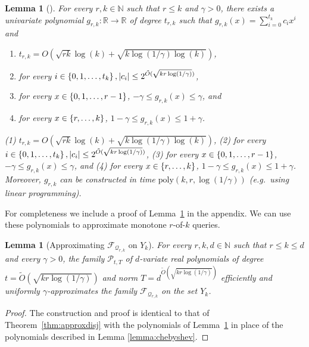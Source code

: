 \documentclass[11pt]{article}
\newcommand\N{\mathbb{N}}
\newcommand\R{\mathbb{R}}
\newcommand\cF{\mathcal{F}}
\newcommand\cP{\mathcal{P}}
\newcommand\cQ{\mathcal{Q}}
\newcommand\poly{\mathrm{poly}}
\newcommand\from{\colon}
\newtheorem{lemma}[theorem]{Lemma}
\theoremstyle{definition}
\begin{document}
\begin{lemma}[\cite{Sherstov09}] \label{lemma:paturi}
For every $r,k \in \N$ such that $r \leq k$ and $\gamma > 0$, there exists a univariate polynomial $g_{r,k}\from \R \to \R$ of degree $t_{r,k}$ such that $g_{r,k}(x) = \sum_{i=0}^{t_k} c_i x^i$ and
\ifnum{}
\begin{enumerate}
\item $t_{r,k} = O\left(\sqrt{rk} \log(k) + \sqrt{k \log(1/\gamma)\log(k)}\right)$,
\item for every $i \in \left\{0,1,\dots, t_k\right\}, |c_i| \leq  2^{\tilde{O}(\sqrt{kr \log(1/\gamma)})}$,
\item for every $x \in \left\{0,1,\dots,r-1\right\}$, $-\gamma \leq g_{r,k}(x) \leq \gamma$, and
\item for every $x \in \left\{r, \dots, k\right\}$, $1-\gamma \leq g_{r,k}(x) \leq 1+\gamma$.
\end{enumerate}
\else
(1) $t_{r,k} = O\left(\sqrt{rk} \log(k) + \sqrt{k \log(1/\gamma)\log(k)}\right)$,
(2) for every $i \in \left\{0,1,\dots, t_k\right\}, |c_i| \leq  2^{\tilde{O}(\sqrt{kr \log(1/\gamma)})}$,
(3) for every $x \in \left\{0,1,\dots,r-1\right\}$, $-\gamma \leq g_{r,k}(x) \leq \gamma$, and
(4) for every $x \in \left\{r, \dots, k\right\}$, $1-\gamma \leq g_{r,k}(x) \leq 1+\gamma$.
\fi
Moreover, $g_{r,k}$ can be constructed in time $\poly(k, r, \log(1/\gamma))$ (e.g.~using linear programming).
\end{lemma}
For completeness we include a proof of Lemma~\ref{lemma:paturi} in the appendix.
We can use these polynomials to approximate monotone $r$-of-$k$ queries.

\begin{lemma}[Approximating $\cF_{\cQ_{r, k}}$ on $Y_k$] \label{thm:approx2}
For every $r,k,d \in \N$ such that $r \leq k \leq d$ and every $\gamma > 0$, the family $\cP_{t,T}$ of $d$-variate real polynomials of degree $t = \tilde{O}(\sqrt{kr \log(1/\gamma)})$ and norm $T = d^{\tilde{O}(\sqrt{kr \log(1/\gamma)})}$ efficiently and uniformly $\gamma$-approximates the family $\cF_{\cQ_{r, k}}$ on the set $Y_k$.
\end{lemma}
\begin{proof}
The construction and proof is identical to that of Theorem~\ref{thm:approxdisj} with the polynomials of Lemma~\ref{lemma:paturi} in place of the polynomials described in Lemma \ref{lemma:chebyshev}.
\end{proof}
\end{document}
